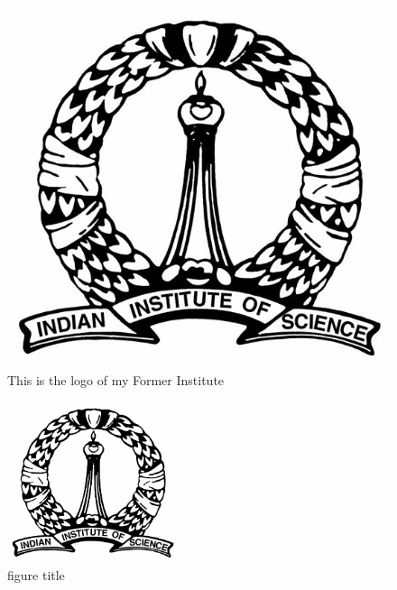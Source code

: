 \documentclass[10pt,a4paper]{article}
\begin{document}
\begin{figure}
\centering
\includegraphics[scale=1.0]{IISc_logo.jpg}
\caption{This is the logo of my Former Institute}  %
\label{reference}        %
\end{figure}

\begin{figure}
\centering
\includegraphics[width=5cm]{IISc_logo.jpg}
\caption{figure title}  %
\label{reference1}        %

\end{figure}
\end{document}
